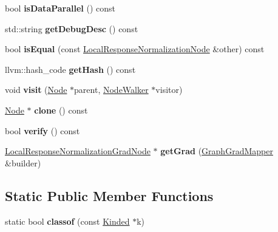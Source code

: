 \begin{DoxyCompactItemize}
bool {\bfseries is\+Data\+Parallel} () const
\item 
\mbox{\label{classglow_1_1_local_response_normalization_node_a4576f47baa280e8c3f2ffa6ac78e3c9a}} 
std\+::string {\bfseries get\+Debug\+Desc} () const
\item 
\mbox{\label{classglow_1_1_local_response_normalization_node_a9dd84d234231d3eac7c3c41d69271688}} 
bool {\bfseries is\+Equal} (const \hyperlink{classglow_1_1_local_response_normalization_node}{Local\+Response\+Normalization\+Node} \&other) const
\item 
\mbox{\label{classglow_1_1_local_response_normalization_node_a7daa606c224290857e859b0a141f30ec}} 
llvm\+::hash\+\_\+code {\bfseries get\+Hash} () const
\item 
\mbox{\label{classglow_1_1_local_response_normalization_node_a50ee7b0ae9e1de04c58586872b722dcd}} 
void {\bfseries visit} (\hyperlink{classglow_1_1_node}{Node} $\ast$parent, \hyperlink{classglow_1_1_node_walker}{Node\+Walker} $\ast$visitor)
\item 
\mbox{\label{classglow_1_1_local_response_normalization_node_a9bbaeea4512099e6ba0a1830d1e1a175}} 
\hyperlink{classglow_1_1_node}{Node} $\ast$ {\bfseries clone} () const
\item 
\mbox{\label{classglow_1_1_local_response_normalization_node_aab6378b8a395982fada4427fb8e688e7}} 
bool {\bfseries verify} () const
\item 
\mbox{\label{classglow_1_1_local_response_normalization_node_a5a4e13144a65366234a60cb422191fd2}} 
\hyperlink{classglow_1_1_local_response_normalization_grad_node}{Local\+Response\+Normalization\+Grad\+Node} $\ast$ {\bfseries get\+Grad} (\hyperlink{classglow_1_1_graph_grad_mapper}{Graph\+Grad\+Mapper} \&builder)
\end{DoxyCompactItemize}
\subsection*{Static Public Member Functions}
\begin{DoxyCompactItemize}
\item 
\mbox{\label{classglow_1_1_local_response_normalization_node_a1a12f1f9591d745f3195508f613764bc}} 
static bool {\bfseries classof} (const \hyperlink{classglow_1_1_kinded}{Kinded} $\ast$k)
\end{DoxyCompactItemize}
